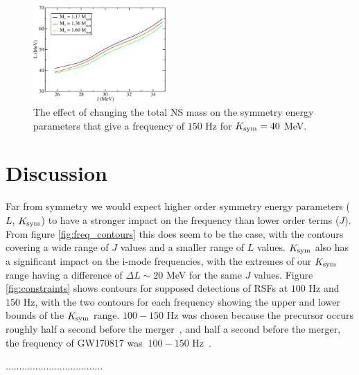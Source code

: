\documentclass[fleqn,usenatbib]{mnras}
\begin{document}
\begin{figure}
\centering
\includegraphics[width=0.45\textwidth,angle=0]{K40_f150_Mcomp.pdf}
\caption{The effect of changing the total NS mass on the symmetry energy parameters that give a frequency of $150$ Hz for $K_{\rm sym} =40$ MeV.}
\label{fig:vary_mass_contours}
\end{figure}







\section{Discussion}
\hspace{\parindent}Far from symmetry we would expect higher order symmetry energy parameters ($L$, $K_{\rm sym}$) to have a stronger impact on the frequency than lower order terms ($J$). From figure \ref{fig:freq_contours} this does seem to be the case, with the contours covering a wide range of $J$ values and a smaller range of $L$ values. $K_{\rm sym}$ also has a significant impact on the i-mode frequencies, with the extremes of our $K_{\rm sym}$ range having a difference of $\Delta L\sim 20$ MeV for the same $J$ values. Figure \ref{fig:constraints} shows contours for supposed detections of RSFs at $100$ Hz and $150$ Hz, with the two contours for each frequency showing the upper and lower bounds of the $K_{\rm sym}$ range. $100-150$ Hz was chosen because the precursor occurs roughly half a second before the merger~\citet{zhong2019precursors}, and half a second before the merger, the frequency of GW170817 was $~100-150$ Hz~\citet{abbott2017merger}.

\hspace{\parindent}....................................
\end{document}
